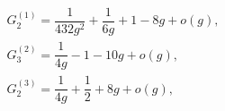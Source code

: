\begin{equation*}
    \begin{array}{l}
    G^{(1)}_2=\dfrac{1}{432g^2}+\dfrac{1}{6g}+1-8g+o(g),
    \\
    G^{(2)}_3=\dfrac{1}{4g}-1-10g+o(g),
    \\
    G^{(3)}_2=\dfrac{1}{4g}+\dfrac 1 2+8g+o(g),
    \end{array}
\end{equation*}

